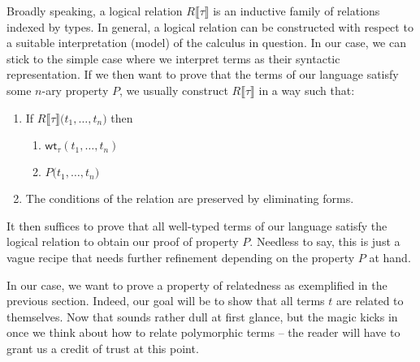 \documentclass[12pt]{article}
\theoremstyle{plain}
\theoremstyle{definition}
\newcommand{\denot}[1]{\llbracket#1\rrbracket}
\newcommand{\wt}[1]{\mathsf{wt}_{#1}}
\begin{document}
Broadly speaking, a logical relation $R\denot{\tau}$ is an inductive family of relations indexed by types.
In general, a logical relation can be constructed with respect to a suitable interpretation (model) of the calculus in question.
In our case, we can stick to the simple case where we interpret terms as their syntactic representation.
If we then want to prove that the terms of our language satisfy some $n$-ary property $P$,
we usually construct $R\denot{\tau}$ in a way such that:
\begin{enumerate}
  \item If $R\denot{\tau}\bigl(t_1,\dotsc,t_n\bigr)$ then
  \begin{enumerate}
    \item $\wt{\tau}(t_1,\dotsc,t_n)$
    \item $P\bigl(t_1,\dotsc,t_n\bigr)$
  \end{enumerate}
  \item The conditions of the relation are preserved by eliminating forms.
\end{enumerate}
It then suffices to prove that
all well-typed terms of our language satisfy the logical relation
to obtain our proof of property $P$.
Needless to say, this is just a vague recipe that needs further refinement depending on the
property $P$ at hand.

In our case, we want to prove a property of relatedness as exemplified in the previous section.
Indeed, our goal will be to show that all terms $t$ are related to themselves.
Now that sounds rather dull at first glance, but the magic kicks in once we think about how to relate polymorphic terms -- the reader will have to grant us a credit of trust at this point.
\end{document}

